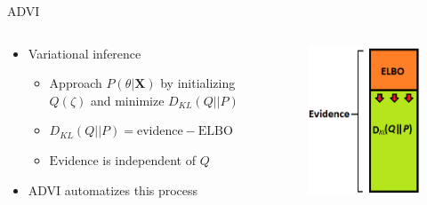 \documentclass{beamer}
\begin{document}
\begin{frame}{ADVI}
\begin{columns}
\begin{column}{0.6\textwidth}
\begin{itemize}
    \item Variational inference
    \begin{itemize}
        \item Approach $P(\theta|\bm{X})$ by initializing $Q(\zeta)$ and minimize $D_{KL}(Q||P)$
        \item $D_{KL}(Q||P) = \text{evidence} - \text{ELBO}$
        \item $\text{Evidence}$ is independent of $Q$
        
    \end{itemize}
    \item ADVI automatizes this process
\end{itemize}
\end{column}
\begin{column}{0.4\textwidth}
\begin{figure}
    \centering
    \includegraphics[width=\linewidth]{ELBO.png}
\end{figure}
\end{column}
\end{columns}
\end{frame}
\end{document}
